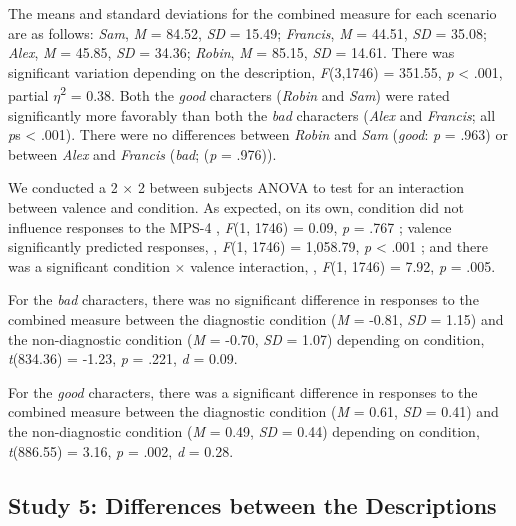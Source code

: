 \documentclass[
  american,
  man,floatsintext]{apa7}
\begin{document}
The means and standard deviations for the combined measure for each scenario are as follows:
\emph{Sam},
\emph{M} = 84.52, \emph{SD} = 15.49;
\emph{Francis},
\emph{M} = 44.51, \emph{SD} = 35.08;
\emph{Alex},
\emph{M} = 45.85, \emph{SD} = 34.36;
\emph{Robin},
\emph{M} = 85.15, \emph{SD} = 14.61. There was significant variation depending on the description, \emph{F}(3,1746) = 351.55, \emph{p} \textless{} .001, partial \(\eta\)\textsuperscript{2} = 0.38. Both the \emph{good} characters (\emph{Robin} and \emph{Sam}) were rated significantly more favorably than both the \emph{bad} characters (\emph{Alex} and \emph{Francis}; all \emph{p}s \textless{} .001). There were no differences between \emph{Robin} and \emph{Sam} (\emph{good}: \emph{p} = .963) or between \emph{Alex} and \emph{Francis} (\emph{bad}; (\emph{p} = .976)).

We conducted a 2 \(\times\) 2 between subjects ANOVA to test for an interaction between valence and condition.
As expected, on its own, condition did not influence responses to the MPS-4
, \emph{F}(1, 1746) = 0.09, \emph{p} = .767
; valence significantly predicted responses,
, \emph{F}(1, 1746) = 1,058.79, \emph{p} \textless{} .001
; and there was a significant condition \(\times\) valence interaction,
, \emph{F}(1, 1746) = 7.92, \emph{p} = .005.

For the \emph{bad} characters, there was no significant difference in responses to the combined measure between the diagnostic condition (\emph{M} = -0.81, \emph{SD} = 1.15) and the non-diagnostic condition (\emph{M} = -0.70, \emph{SD} = 1.07) depending on condition, \emph{t}(834.36) = -1.23, \emph{p} = .221, \emph{d} = 0.09.

For the \emph{good} characters, there was a significant difference in responses to the combined measure between the diagnostic condition (\emph{M} = 0.61, \emph{SD} = 0.41) and the non-diagnostic condition (\emph{M} = 0.49, \emph{SD} = 0.44) depending on condition, \emph{t}(886.55) = 3.16, \emph{p} = .002, \emph{d} = 0.28.

\hypertarget{study-5-differences-between-the-descriptions}{%
\subsection{Study 5: Differences between the Descriptions}\label{study-5-differences-between-the-descriptions}}
\end{document}
